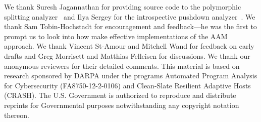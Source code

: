 \documentclass[9pt]{sigplanconf} %
\begin{document}
We thank Suresh Jagannathan for providing source code to the
polymorphic splitting
analyzer~\cite{dvanhorn:wright-jagannathan-toplas98} and Ilya Sergey
for the introspective pushdown
analyzer~\cite{dvanhorn:Earl2012Introspective}.  
%
We thank Sam Tobin-Hochstadt for encouragement and feedback---he was
the first to prompt us to look into how make effective
implementations of the AAM approach.
%
We thank Vincent St-Amour and Mitchell Wand for feedback on early drafts
and Greg Morrisett and Matthias Felleisen for discussions.
%
We thank our anonymous reviewers for their detailed comments.
%
This material is based on research sponsored by DARPA under the
programs Automated Program Analysis for Cybersecurity
(FA8750-12-2-0106) and Clean-Slate Resilient Adaptive Hosts (CRASH).
The U.S. Government is authorized to reproduce and distribute reprints
for Governmental purposes notwithstanding any copyright notation
thereon.


\balance

%



% 
\end{document}
